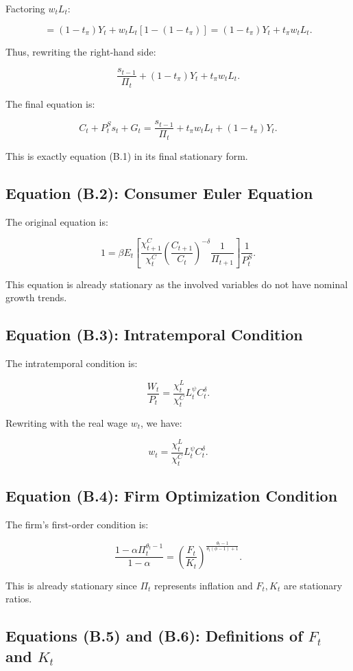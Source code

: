 \documentclass[12pt]{article}
\begin{document}
Factoring \(w_t L_t\):

\[
= (1 - t_\pi) Y_t + w_t L_t [1 - (1 - t_\pi)] = (1 - t_\pi) Y_t + t_\pi w_t L_t.
\]

Thus, rewriting the right-hand side:

\[
\frac{s_{t-1}}{\Pi_t} + (1 - t_\pi) Y_t + t_\pi w_t L_t.
\]

The final equation is:

\[
C_t + P_t^S s_t + G_t = \frac{s_{t-1}}{\Pi_t} + t_\pi w_t L_t + (1 - t_\pi) Y_t.
\]

This is exactly equation (B.1) in its final stationary form.


\subsection{Equation (B.2): Consumer Euler Equation}

The original equation is:

\[
1 = \beta E_t\left[\frac{\chi_{t+1}^C}{\chi_t^C}\left(\frac{C_{t+1}}{C_t}\right)^{-\delta} \frac{1}{\Pi_{t+1}}\right] \frac{1}{P_t^S}.
\]

This equation is already stationary as the involved variables do not have nominal growth trends.


\subsection{Equation (B.3): Intratemporal Condition}

The intratemporal condition is:

\[
\frac{W_t}{P_t} = \frac{\chi_t^L}{\chi_t^C} L_t^\psi C_t^\delta.
\]

Rewriting with the real wage \(w_t\), we have:

\[
w_t = \frac{\chi_t^L}{\chi_t^C} L_t^\psi C_t^\delta.
\]


\subsection{Equation (B.4): Firm Optimization Condition}

The firm's first-order condition is:

\[
\frac{1-\alpha \Pi_t^{\theta_t-1}}{1-\alpha} = \left(\frac{F_t}{K_t}\right)^{\frac{\theta_t - 1}{\theta_t(\phi-1)+1}}.
\]

This is already stationary since \(\Pi_t\) represents inflation and \(F_t, K_t\) are stationary ratios.


\subsection{Equations (B.5) and (B.6): Definitions of \(F_t\) and \(K_t\)}
\end{document}
